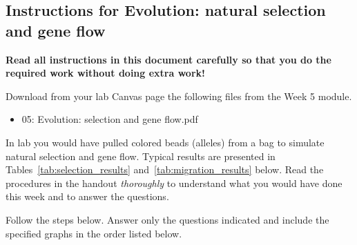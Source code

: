 \documentclass[12pt]{exam}
\begin{document}
\subsection*{Instructions for Evolution: natural selection and gene flow}


\textbf{Read all instructions in this document carefully so that you do the required work without doing extra work!}

Download from your lab Canvas page the following files from the Week 5 module.

\begin{itemize}
\item 05: Evolution: selection and gene flow.pdf
\end{itemize}

In lab you would have pulled colored beads (alleles) from a bag to simulate natural selection and gene flow. Typical results are presented in Tables~\ref{tab:selection_results} and~\ref{tab:migration_results} below.  Read the procedures in the handout \emph{thoroughly} to understand what you would have done this week and to answer the questions.

Follow the steps below. Answer only the questions indicated and include the specified graphs in the order listed below.
\end{document}
